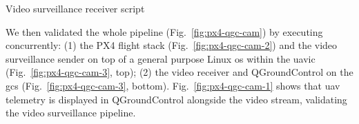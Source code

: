 \begin{longlisting}
\centering
\inputminted[]{bash}{./listing/gstreamerReceiver.sh}
\caption{Video surveillance receiver script}
\label{lst:gstreamer-receiver}
\end{longlisting}

We then validated the whole pipeline (Fig.~\ref{fig:px4-qgc-cam}) by executing concurrently: (1) the PX4
flight stack (Fig.~\ref{fig:px4-qgc-cam-2}) and the video surveillance sender on
top of a general purpose Linux \gls{os}
within the \gls{uavic} (Fig.~\ref{fig:px4-qgc-cam-3}, top); (2) the video receiver
and QGroundControl on the \gls{gcs} (Fig.~\ref{fig:px4-qgc-cam-3}, bottom).
Fig.~\ref{fig:px4-qgc-cam-1} shows that \gls{uav} telemetry is displayed in
QGroundControl alongside the video stream, validating the video surveillance pipeline.


